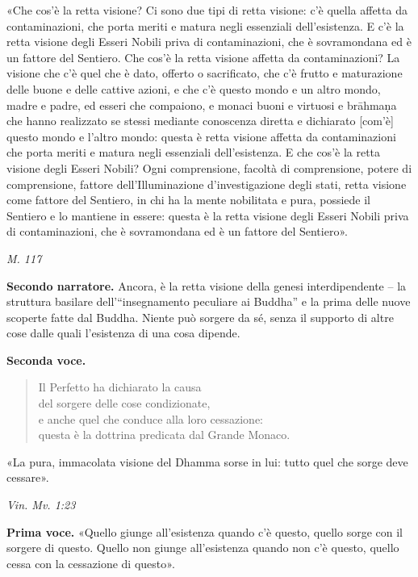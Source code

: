 «Che cos’è la retta visione? Ci sono due tipi di retta visione: c’è
quella affetta da contaminazioni, che porta meriti e matura negli
essenziali dell’esistenza. E c’è la retta visione degli Esseri Nobili
priva di contaminazioni, che è sovramondana ed è un fattore del
Sentiero. Che cos’è la retta visione affetta da contaminazioni? La
visione che c’è quel che è dato, offerto o sacrificato, che c’è frutto e
maturazione delle buone e delle cattive azioni, e che c’è questo mondo e
un altro mondo, madre e padre, ed esseri che compaiono, e monaci buoni e
virtuosi e brāhmaṇa che hanno realizzato se stessi mediante conoscenza
diretta e dichiarato [com’è] questo mondo e l’altro mondo: questa è
retta visione affetta da contaminazioni che porta meriti e matura negli
essenziali dell’esistenza. E che cos’è la retta visione degli Esseri
Nobili? Ogni comprensione, facoltà di comprensione, potere di
comprensione, fattore dell’Illuminazione d’investigazione degli stati,
retta visione come fattore del Sentiero, in chi ha la mente nobilitata e
pura, possiede il Sentiero e lo mantiene in essere: questa è la retta
visione degli Esseri Nobili priva di contaminazioni, che è sovramondana
ed è un fattore del Sentiero».


\emph{M. 117}


\textbf{Secondo narratore.} Ancora, è la retta visione della genesi
interdipendente – la struttura basilare dell’“insegnamento peculiare ai
Buddha” e la prima delle nuove scoperte fatte dal Buddha. Niente può
sorgere da sé, senza il supporto di altre cose dalle quali l’esistenza
di una cosa dipende.


\textbf{Seconda voce.}


\begin{quotation}
Il Perfetto ha dichiarato la causa \\
del sorgere delle cose condizionate, \\
e anche quel che conduce alla loro cessazione: \\
questa è la dottrina predicata dal Grande Monaco.
\end{quotation}

«La pura, immacolata visione del Dhamma sorse in lui: tutto quel che
sorge deve cessare».


\emph{Vin. Mv. 1:23}


\textbf{Prima voce.} «Quello giunge all’esistenza quando c’è questo, quello sorge
con il sorgere di questo. Quello non giunge all’esistenza quando non c’è
questo, quello cessa con la cessazione di questo».


